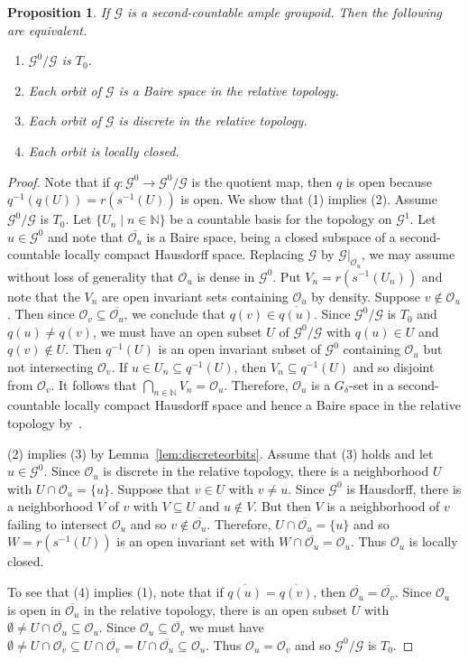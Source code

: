 \documentclass[11pt,reqno]{amsart}
\theoremstyle{plain}
\newtheorem{prop}[thm]{Proposition}
\numberwithin{equation}{section}
\newcommand{\G}[0]{\mathscr{G}}
\newcommand{\orb}[0]{\mathcal{O}}
\begin{document}
\begin{prop}\label{p:locally.closed}
If $\mathscr G$ is a second-countable ample groupoid.  Then the following are equivalent.
\begin{enumerate}
\item  $\mathscr G^0/\mathscr G$ is $T_0$.
\item Each orbit of $\G$ is a Baire space in the relative topology.
\item Each orbit of $\G$ is discrete in the relative topology.
\item Each orbit is locally closed.
\end{enumerate}
\end{prop}
\begin{proof}
Note that if $q\colon \G^0\to \G^0/\G$ is the quotient map, then $q$ is open because $q^{-1}(q(U)) = r(s^{-1}(U))$ is open.
We show that (1) implies (2).  Assume $\G^0/\G$ is $T_0$.  Let $\{U_n\mid n\in \mathbb N\}$ be a countable basis for the topology on $\G^1$.  Let $u\in\G^0$ and note that $\overline{\orb_u}$ is a Baire space, being a closed subspace of a second-countable locally compact Hausdorff space.  Replacing $\G$ by $\G|_{\overline{\orb_u}}$, we may assume without loss of generality that $\orb_u$ is dense in $\G^0$.  Put $V_n =r(s^{-1}(U_n))$ and note that the $V_n$ are open invariant sets containing $\orb_u$ by density.  Suppose $v\notin \orb_u$.  Then since $\orb_v\subseteq \overline{\orb_u}$, we conclude that $q(v)\in \overline{q(u)}$.  Since $\G^0/\G$ is $T_0$ and $q(u)\neq q(v)$, we must have an open subset $U$ of $\G^0/\G$ with $q(u)\in U$ and $q(v)\notin U$.  Then $q^{-1}(U)$ is an open invariant subset of $\G^0$ containing $\orb_u$ but not intersecting $\orb_v$.  If $u\in U_n\subseteq q^{-1}(U)$, then $V_n\subseteq q^{-1}(U)$ and so disjoint from $\orb_v$.  It follows that $\bigcap_{n\in \mathbb N} V_n = \orb_u$.  Therefore, $\orb_u$ is a $G_{\delta}$-set in a second-countable locally compact Hausdorff space and hence a Baire space in the relative topology by~\cite[Lemma~6.4]{CrossedProd}.

(2) implies (3) by Lemma~\ref{lem:discreteorbits}.  Assume that (3) holds and let $u\in \G^0$.  Since $\orb_u$ is discrete in the relative topology, there is a neighborhood $U$ with $U\cap \orb_u = \{u\}$.  Suppose that $v\in U$ with $v\neq u$.  Since $\G^0$ is Hausdorff, there is a neighborhood $V$ of $v$ with $V\subseteq U$ and $u\notin V$.  But then $V$ is a neighborhood of $v$ failing to intersect $\orb_u$ and so $v\notin \overline{\orb_u}$.  Therefore, $U\cap \overline{\orb_u} = \{u\}$ and so $W=r(s^{-1}(U))$ is an open invariant set with $W\cap \overline{\orb_u}=\orb_u$.  Thus $\orb_u$ is locally closed.

To see that (4)  implies (1), note that if $\overline{q(u)}=\overline{q(v)}$, then $\overline{\orb_u}=\overline{\orb_v}$.  Since $\orb_u$ is open in $\overline{\orb_u}$ in the relative topology, there is an open subset $U$ with $\emptyset\neq U\cap \overline{\orb_u} \subseteq \orb_u$.  Since $\orb_u\subseteq \overline{\orb_v}$ we must have $\emptyset\neq U\cap \orb_v\subseteq U\cap \overline{\orb_v} = U\cap \overline{\orb_u} \subseteq \orb_u$.  Thus $\orb_u=\orb_v$ and so $\G^0/\G$ is $T_0$.
\end{proof}
\end{document}
